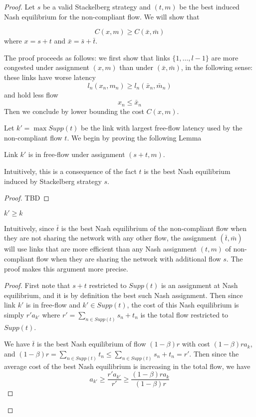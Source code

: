 \begin{proof}
Let $s$ be a valid Stackelberg strategy and $(t, m)$ be the best induced Nash equilibrium for the non-compliant flow. We will show that

\[
C(x, m) \geq C(\bar{x}, \bar{m})
\]
where $x = s+t$ and $\bar{x} = \bar{s} + \bar{t}$.

\noindent The proof proceeds as follows: we first show that links $\{1, \dots, l-1\}$ are more congested under assignment $(x, m)$ than under $(\bar{x}, \bar{m})$, in the following sense: these links have worse latency
\[
l_n(x_n, m_n) \geq l_n(\bar{x}_n, \bar{m}_n)
\]
and hold less flow
\[
x_n \leq \bar{x}_n
\]
Then we conclude by lower bounding the cost $C(x, m)$.

\bigskip

Let $k' = \max Supp(t)$ be the link with largest free-flow latency used by the non-compliant flow $t$. We begin by proving the following Lemma

\begin{lemma}
Link $k'$ is in free-flow under assignment $(s+t, m)$.
\end{lemma}

Intuitively, this is a consequence of the fact $t$ is the best Nash equilibrium induced by Stackelberg strategy $s$.
\begin{proof}
TBD
\end{proof}


\begin{lemma}
$k' \geq k$
\end{lemma}
Intuitively, since $\bar{t}$ is the best Nash equilibrium of the non-compliant flow when they are not sharing the network with any other flow, the assignment $(\bar{t},\bar{m})$ will use links that are more efficient than any Nash assignment $(t, m)$ of non-compliant flow when they are sharing the network with additional flow $s$. The proof makes this argument more precise.

\begin{proof}
First note that $s+t$ restricted to $Supp(t)$ is an assignment at Nash equilibrium, and it is by definition the best such Nash assignment. Then since link $k'$ is in free-flow and $k' \in Supp(t)$, the cost of this Nash equilibrium is simply $r'a_{k'}$ where $r' = \sum_{n\in Supp(t)} s_n + t_n$ is the total flow restricted to $Supp(t)$.

We have $\bar{t}$ is the best Nash equilibrium of flow $(1-\beta)r$ with cost $(1 - \beta)r a_k$, and $(1 - \beta)r = \sum_{n\in Supp(t)} t_n \leq \sum_{n\in Supp(t)} s_n + t_n = r'$. Then since the average cost of the best Nash equilibrium is increasing in the total flow, we have
\[
a_{k'} \geq\frac{r'a_{k'}}{r'} \geq \frac{(1-\beta)r a_k}{(1-\beta)r}
\]


\end{proof}
\end{proof}
